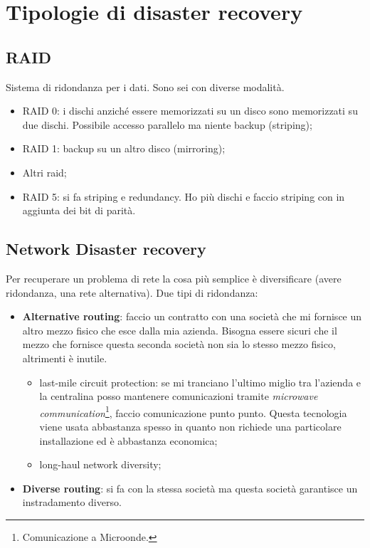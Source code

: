 \section{Tipologie di disaster recovery}

\subsection{RAID}

Sistema di ridondanza per i dati. Sono sei con diverse modalità.
\begin{itemize}
  \item RAID 0: i dischi anziché essere memorizzati su un disco sono
  memorizzati su due dischi. Possibile accesso parallelo ma niente backup
  (striping);
  \item RAID 1: backup su un altro disco (mirroring);
  \item Altri raid;
  \item RAID 5: si fa striping e redundancy. Ho più dischi e faccio striping
  con in aggiunta dei bit di parità.
\end{itemize}

\subsection{Network Disaster recovery}

Per recuperare un problema di rete la cosa più semplice è diversificare (avere
ridondanza, una rete alternativa). Due tipi di ridondanza:
\begin{itemize}
  \item \textbf{Alternative routing}: faccio un contratto con una società che
  mi fornisce un altro mezzo fisico che esce dalla mia azienda. Bisogna essere
sicuri che il mezzo che fornisce questa seconda società non sia lo stesso mezzo
fisico, altrimenti è inutile.
  \begin{itemize}
    \item last-mile circuit protection: se mi tranciano l'ultimo miglio tra
l'azienda e la centralina posso mantenere comunicazioni tramite
\textit{microwave communication}\footnote{Comunicazione a Microonde.}, faccio
comunicazione punto punto. Questa tecnologia viene usata abbastanza spesso in
quanto non richiede una particolare installazione ed è abbastanza economica;
    \item long-haul network diversity;
  \end{itemize}
  \item \textbf{Diverse routing}: si fa con la stessa società ma questa società
garantisce un instradamento diverso.
\end{itemize}

